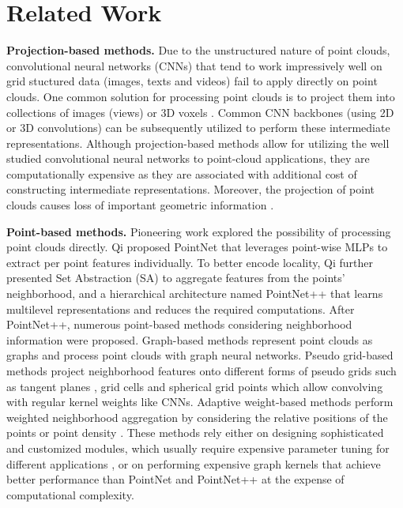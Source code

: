 \documentclass{article}
\newcommand{\mysection}[1]{\vspace{3pt}\noindent\textbf{#1.}}
\begin{document}
 \section{Related Work}
\label{sec:related}

\mysection{Projection-based methods}
Due to the unstructured nature of point clouds, convolutional neural networks (CNNs) that tend to work impressively well on grid stuctured data (\eg images, texts and videos) fail to apply directly on point clouds. One common solution for processing point clouds is to project them into collections of images (views) \cite{Su2015MultiviewCN, Feng2018GVCNNGC, Wei2020ViewGCNVG} or 3D voxels \cite{Graham20183DSS, Yan2018SECONDSE, Tang2020SearchingE3}. 
Common CNN backbones (using 2D or 3D convolutions) can be subsequently utilized to perform these intermediate representations. Although projection-based methods allow for utilizing the well studied convolutional neural networks to point-cloud applications, they are computationally expensive as they are associated with additional cost of constructing intermediate representations. Moreover, the projection of point clouds causes loss of important geometric information \cite{Liu2019PointVoxelCF}. 


\mysection{Point-based methods}
Pioneering work explored the possibility of processing point clouds directly. Qi \etal proposed PointNet \cite{Qi2017PointNetDL} that leverages point-wise MLPs to extract per point features individually. To better encode locality, Qi \etal further presented Set Abstraction (SA) to aggregate features from the points' neighborhood, and a hierarchical architecture named PointNet++ \cite{Qi2017PointNetDH} that learns multilevel representations and reduces the required computations. After PointNet++, numerous point-based methods considering neighborhood information were proposed. Graph-based methods \cite{simonovsky2017dynamic,landrieu2018large, dgcnn,wang2019graph, Li2019DeepGCNs, Li2021DeepGCNsMG,Qian_2021_CVPR} represent point clouds as graphs and process point clouds with graph neural networks. Pseudo grid-based methods project neighborhood features onto different forms of pseudo grids such as tangent planes \cite{Tatarchenko2018TangentCF}, grid cells \cite{Hua_2018pointwisecnn,xu2018spidercnn, PointCNN,mao2019interpolated,Thomas2019KPConvFA} and spherical grid points \cite{Zhang2019ShellNetEP} which allow convolving with regular kernel weights like CNNs. Adaptive weight-based methods perform weighted neighborhood aggregation by considering the relative positions of the points \cite{wang2018deep,Liu2019RelationShapeCN,accv2018/Groh,Liu2020ACL} or point density \cite{PointConv}. These methods rely either on designing sophisticated and customized modules, which usually require expensive parameter tuning for different applications \cite{Thomas2019KPConvFA, PointCNN, Ma2018ShuffleNetVP}, or on performing expensive graph kernels \cite{dgcnn, Li2019DeepGCNs} that achieve better performance than PointNet and PointNet++ at the expense of computational complexity. 
\end{document}

